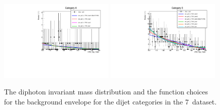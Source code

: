 \begin{figure}
  \includegraphics[width=0.49\textwidth]{analysis/plots/mva_7TeV/multipdf_cat4.pdf}
  \includegraphics[width=0.49\textwidth]{analysis/plots/mva_7TeV/multipdf_cat5.pdf}\\
  \caption{The diphoton invariant mass distribution and the function choices for the background envelope for the dijet categories in the 7~\TeV dataset. }
  \label{fig:multipdf2}
\end{figure}

